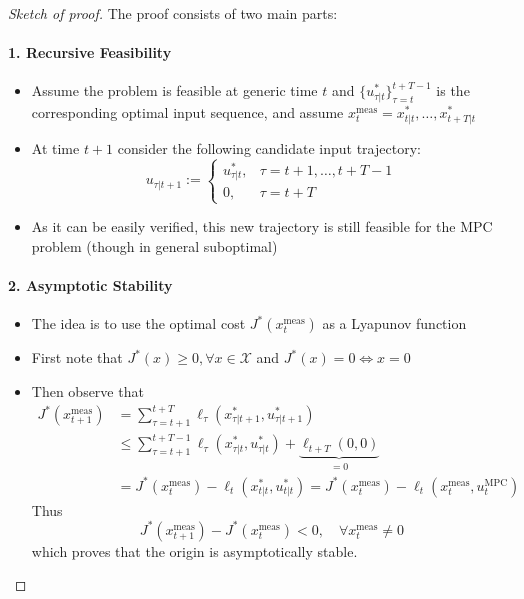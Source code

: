 \documentclass[openany]{book}
\theoremstyle{definition}
\theoremstyle{remark}
\begin{document}
\begin{proof}[Sketch of proof]
The proof consists of two main parts:

\paragraph{1. Recursive Feasibility}
\begin{itemize}
    \item Assume the problem is feasible at generic time $t$ and $\{u_{\tau|t}^*\}_{\tau=t}^{t+T-1}$ is the corresponding optimal input sequence, and assume $x_t^{\text{meas}} = x_{t|t}^*, \ldots, x_{t+T|t}^*$
    \item At time $t+1$ consider the following candidate input trajectory:
    \[
        u_{\tau|t+1} := \begin{cases}
            u_{\tau|t}^*, & \tau = t+1,\ldots,t+T-1 \\
            0, & \tau = t+T
        \end{cases}
    \]
    \item As it can be easily verified, this new trajectory is still feasible for the MPC problem (though in general suboptimal)
\end{itemize}

\paragraph{2. Asymptotic Stability}
\begin{itemize}
    \item The idea is to use the optimal cost $J^*(x_t^{\text{meas}})$ as a Lyapunov function
    \item First note that $J^*(x) \geq 0, \forall x \in \mathcal{X}$ and $J^*(x) = 0 \iff x = 0$
    \item Then observe that
    \begin{align*}
        J^*(x_{t+1}^{\text{meas}}) &= \sum_{\tau=t+1}^{t+T} \ell_\tau(x_{\tau|t+1}^*, u_{\tau|t+1}^*) \\
        &\leq \sum_{\tau=t+1}^{t+T-1} \ell_\tau(x_{\tau|t}^*, u_{\tau|t}^*) + \underbrace{\ell_{t+T}(0,0)}_{=0} \\
        &= J^*(x_t^{\text{meas}}) - \ell_t(x_{t|t}^*, u_{t|t}^*) = J^*(x_t^{\text{meas}}) - \ell_t(x_t^{\text{meas}}, u_t^{\text{MPC}})
    \end{align*}
    Thus
    \[
        J^*(x_{t+1}^{\text{meas}}) - J^*(x_t^{\text{meas}}) < 0, \quad \forall x_t^{\text{meas}} \neq 0
    \]
    which proves that the origin is asymptotically stable.
\end{itemize}
\end{proof}
\end{document}
